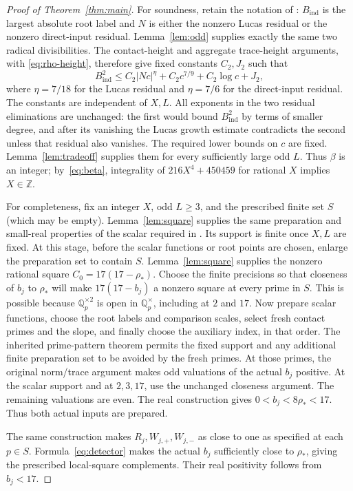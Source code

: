 \documentclass[11pt,a4paper]{article}
\newcommand{\Q}{\mathbb Q}\newcommand{\Z}{\mathbb Z}
\begin{document}
\begin{proof}[Proof of Theorem~\ref{thm:main}]
For soundness, retain the notation of \cite[Sections 3--4]{General}:
$B_{\mathrm{ind}}$ is the largest absolute root label and $N$ is either
the nonzero Lucas residual or the nonzero direct-input residual.
Lemma~\ref{lem:odd} supplies exactly the same two radical divisibilities.
The contact-height and aggregate trace-height arguments, with
\eqref{eq:rho-height}, therefore give fixed constants $C_2,J_2$ such that
\[
 B_{\mathrm{ind}}^2\le
 C_2|Nc|^\eta+C_2c^{7/9}+C_2\log c+J_2,
\]
where $\eta=7/18$ for the Lucas residual and $\eta=7/6$ for the
direct-input residual. The constants are independent of $X,L$.
All exponents in the two residual eliminations are unchanged: the first
would bound $B_{\mathrm{ind}}^2$ by terms of smaller degree, and after
its vanishing the Lucas growth estimate contradicts the second unless
that residual also vanishes. The required lower bounds on $c$ are fixed.
Lemma~\ref{lem:tradeoff} supplies them for every sufficiently large odd
$L$. Thus $\beta$ is an integer; by~\eqref{eq:beta}, integrality of
$216X^4+450459$ for rational $X$ implies $X\in\Z$.

For completeness, fix an integer $X$, odd $L\ge3$, and the prescribed
finite set $S$ (which may be empty).
Lemma~\ref{lem:square} supplies the same preparation and small-real
properties of the scalar required in \cite[Section 5]{General}.
Its support is finite once $X,L$ are fixed. At this stage, before the
scalar functions or root points are chosen, enlarge the preparation set
to contain $S$. Lemma~\ref{lem:square} supplies the nonzero rational
square $C_0=17(17-\rho_*)$. Choose the finite precisions so that
closeness of $b_j$ to $\rho_*$ will make $17(17-b_j)$ a nonzero
square at every prime in $S$. This is possible because
$\Q_p^{\times2}$ is open in $\Q_p^\times$, including at $2$ and $17$.
Now prepare scalar functions,
choose the root labels and comparison scales, select fresh contact
primes and the slope, and finally choose the auxiliary index, in that
order. The inherited prime-pattern theorem permits the fixed support
and any additional finite preparation set to be avoided by the fresh
primes. At those primes, the original norm/trace argument makes odd
valuations of the actual $b_j$ positive. At the scalar support and at
$2,3,17$, use the unchanged closeness argument. The remaining valuations
are even. The real construction gives
$0<b_j<8\rho_*<17$. Thus both actual inputs are prepared.

The same construction makes $R_j,W_{j,+},W_{j,-}$ as close to one
as specified at each $p\in S$. Formula~\eqref{eq:detector} makes the
actual $b_j$ sufficiently close to $\rho_*$, giving the prescribed
local-square complements. Their real positivity follows from $b_j<17$.


\end{proof}
\end{document}
